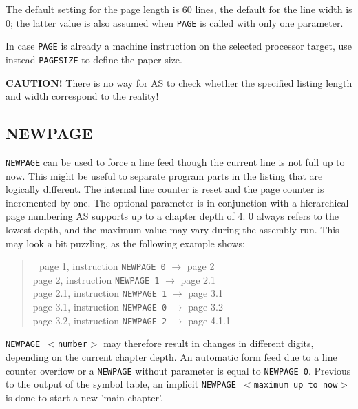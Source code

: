 \documentclass[12pt,twoside]{report}
\makeatletter
\newcommand{\bb}[1]{{\bf #1}}
\newcommand{\tty}[1]{{\tt #1}}
\newcommand{\ttindex}[1]{\index{#1@{\tt #1}}}
\makeatother
\begin{document}
The default setting for the page length is 60 lines, the default for the
line width is 0; the latter value is also assumed when \tty{PAGE} is
called with only one parameter.

In case \tty{PAGE} is already a machine instruction on the
selected processor target, use instead \tty{PAGESIZE} to define
the paper size.

\bb{CAUTION!}  There is no way for AS to check whether the specified
listing length and width correspond to the reality!


\subsection{NEWPAGE}
\ttindex{NEWPAGE}

\tty{NEWPAGE} can be used to force a line feed though the current line is
not full up to now.  This might be useful to separate program parts
in the listing that are logically different.  The internal line
counter is reset and the page counter is incremented by one.  The
optional parameter is in conjunction with a hierarchical page
numbering AS supports up to a chapter depth of 4.  0 always refers to
the lowest depth, and the maximum value may vary during the assembly
run.  This may look a bit puzzling, as the following example shows:
\begin{quote}\begin{tabbing}
\hspace{2.5cm} \= \hspace{4.5cm} \= \kill
page 1,   \> instruction \tty{NEWPAGE 0} \>  $\rightarrow$ page 2 \\
page 2,   \> instruction \tty{NEWPAGE 1} \>  $\rightarrow$ page 2.1 \\
page 2.1, \> instruction \tty{NEWPAGE 1} \>  $\rightarrow$ page 3.1 \\
page 3.1, \> instruction \tty{NEWPAGE 0} \>  $\rightarrow$ page 3.2 \\
page 3.2, \> instruction \tty{NEWPAGE 2} \>  $\rightarrow$ page 4.1.1 \\
\end{tabbing}\end{quote}
\tty{NEWPAGE $<$number$>$} may therefore result in
changes in different digits, depending on the current chapter depth.  An
automatic form feed due to a line counter overflow or a \tty{NEWPAGE}
without parameter is equal to \tty{NEWPAGE 0}.  Previous to the output of
the symbol table, an implicit \tty{NEWPAGE $<$maximum up to now$>$} is
done to start a new 'main chapter'.
\end{document}
